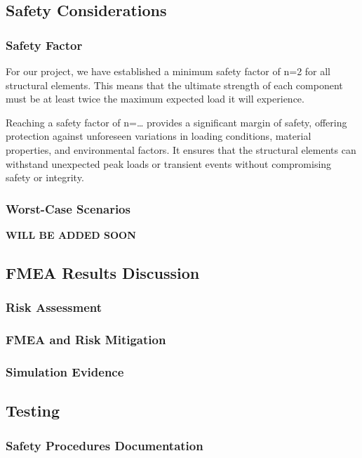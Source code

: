 \subsection{Safety Considerations}


\subsubsection{Safety Factor}

For our project, we have established a minimum safety factor of n=2 for all structural elements. This means that the ultimate strength of each component must be at least twice the maximum expected load it will experience.

Reaching a safety factor of n=… provides a significant margin of safety, offering protection against unforeseen variations in loading conditions, material properties, and environmental factors. It ensures that the structural elements can withstand unexpected peak loads or transient events without compromising safety or integrity.


\subsubsection{Worst-Case Scenarios}

\textbf{WILL BE ADDED SOON}




\subsection{FMEA Results Discussion}
\subsubsection{Risk Assessment}
\subsubsection{FMEA and Risk Mitigation}
\subsubsection{Simulation Evidence}




\subsection{Testing}


\subsubsection{Safety Procedures Documentation}

